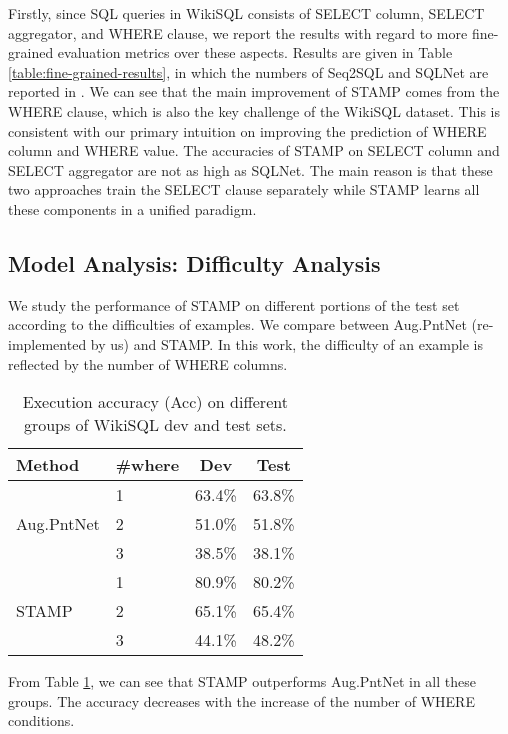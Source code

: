 \documentclass[11pt,a4paper]{article}
\begin{document}
{Firstly}, since SQL queries in WikiSQL \mbox{consists} of SELECT column, SELECT aggregator, and WHERE clause, we report the results with regard to more fine-grained evaluation metrics over these aspects.
Results are given in Table \ref{table:fine-grained-results}, in which the numbers of Seq2SQL and SQLNet are reported in \cite{xu2017sqlnet}.
We can see that the main improvement of STAMP comes from the WHERE clause, which is also the key challenge of the WikiSQL dataset.
This is consistent with our primary intuition on improving the prediction of WHERE column and WHERE value.
The accuracies of \mbox{STAMP} on SELECT column and SELECT aggregator are not as high as SQLNet.
The main reason is that these two approaches train the \mbox{SELECT} clause separately while STAMP learns all these components in a unified paradigm.



\vspace{-0.3cm}
\subsection{Model Analysis: Difficulty Analysis}
We study the performance of STAMP on different portions of the test set according to the difficulties of examples.
We compare between Aug.PntNet (re-implemented by us) and STAMP.
In this work, the difficulty of an example is reflected by the number of WHERE columns.


\begin{table}[h]
	\centering
	\begin{tabular}{p{2cm}lcc}
		\hline
Method & \#where & Dev & Test\\
\hline
\multirow{3}{*}{Aug.PntNet} &   1  & 63.4\%& 63.8\% \\
		&  2   & 51.0\%& 51.8\%\\
		&  3  & 38.5\%& 38.1\%\\
		\hline
\multirow{3}{*}{STAMP} &   1 & 80.9\%& 80.2\%\\
		& 2  &  65.1\%& 65.4\%\\
		&  3 &  44.1\%& 48.2\%\\
		\hline
	\end{tabular}
	\caption{Execution accuracy (Acc) on different groups of WikiSQL dev and test sets. }
	\label{table:difficulty}
\end{table}
From Table \ref{table:difficulty}, we can see that STAMP outperforms Aug.PntNet in all these groups.
The accuracy decreases with the increase of the number of WHERE conditions.
\end{document}
